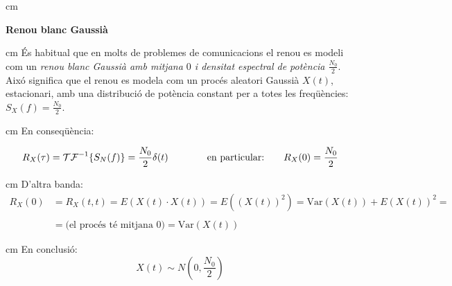 \documentclass{article}
\begin{document}
 cm

\textbf{\large Renou blanc Gaussi\`a}

 cm
\'Es habitual que en molts de problemes de comunicacions el renou es modeli com un 
\textit{renou blanc Gaussi\`a amb mitjana $0$ i densitat espectral de pot\`encia $\frac{N_0}{2}$}.
Aix\'o significa que el renou es modela com un proc\'es aleatori Gaussi\`a $X(t)$, estacionari,  
amb una distribuci\'o de pot\`encia constant per a totes les freq\"u\`encies: $S_X(f)=\frac{N_0}{2}$.

 cm
En conseq\"u\`encia:

\[
R_X(\tau)={\cal TF}^{-1} \{ S_N(f) \} = \frac{N_0}{2} \delta(t)
\qquad \qquad \text{en particular:} \qquad R_X(0)=\frac{N_0}{2}
\]

 cm
D'altra banda:
\[
\begin{array}{ll}
R_X(0)&= R_X(t, t)=E(X(t) \cdot X(t))=E( (X(t))^2 ) = \mathrm{Var}(X(t)) + E(X(t))^2 = \\ \\
&=\text{(el proc\'es t\'e mitjana 0)}=\mathrm{Var}(X(t))
\end{array}
\]

 cm
En conclusi\'o:
\[
X(t) \sim N(0, \frac{N_0}{2} )
\]
\end{document}

